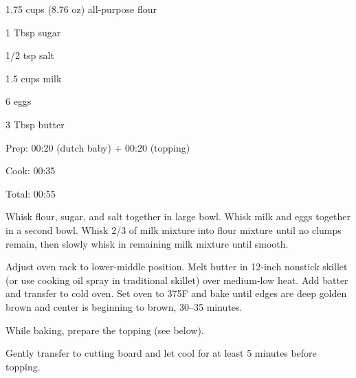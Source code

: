 \documentclass[oneside]{book}  %
\newcommand{\degF}{\textdegree F\xspace}
\begin{document}
\begin{IT}[0.727]
  \begin{ingredients}
    \item[1.75 cups (8.76 oz)] all-purpose flour
    \item[1 Tbsp] sugar
    \item[1/2 tsp] salt
    \item[1.5 cups] milk
    \item[6] eggs
    \item[3 Tbsp] butter
  \end{ingredients}

  \switchcolumn

  \begin{timeline}
    \item[Prep:]  00:20 (dutch baby) + 00:20 (topping)
    \item[Cook:]  00:35
    \item[Total:] 00:55
  \end{timeline}
\end{IT}

\begin{directions}
  \item Whisk flour, sugar, and salt together in large bowl. Whisk milk and eggs
    together in a second bowl. Whisk 2/3 of milk mixture into flour mixture
    until no clumps remain, then slowly whisk in remaining milk mixture until
    smooth.

  \item Adjust oven rack to lower-middle position. Melt butter in 12-inch
    nonstick skillet (or use cooking oil spray in traditional skillet) over
    medium-low heat. Add batter and transfer to cold oven. Set oven to 375\degF
    and bake until edges are deep golden brown and center is beginning to brown,
    30--35 minutes.

  \item While baking, prepare the topping (see below).

  \item Gently transfer to cutting board and let cool for at least 5 minutes
    before topping.
\end{directions}

\smallskip
\end{document}
